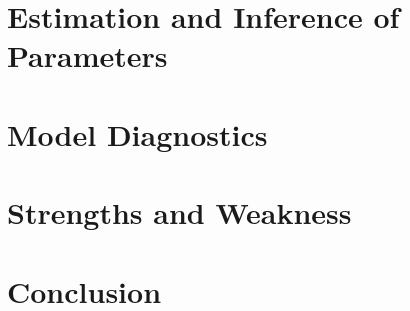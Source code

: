 \documentclass[12pt]{article}
\begin{document}
\section{\sffamily Estimation and Inference of Parameters}

\section{\sffamily Model Diagnostics}

\section{\sffamily Strengths and Weakness}

\section{\sffamily Conclusion}
\end{document}

